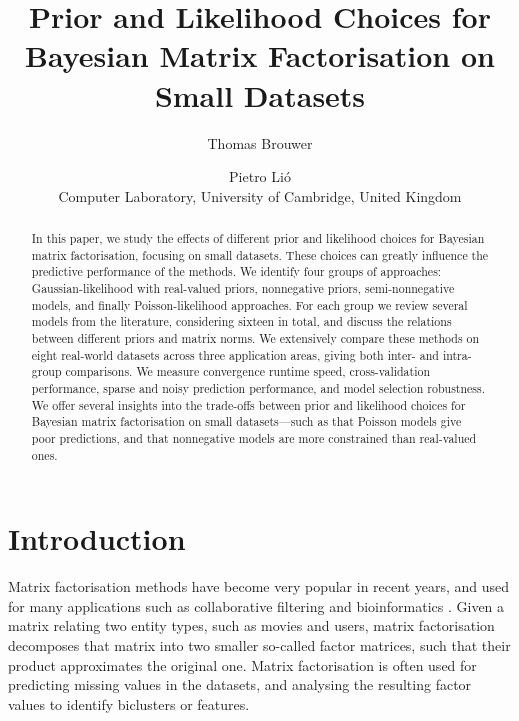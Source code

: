 \documentclass[letterpaper]{article} %
\begin{document}
%
\title{Prior and Likelihood Choices for Bayesian Matrix Factorisation on Small Datasets}
\author{Thomas Brouwer \and Pietro Li\'{o} \\
Computer Laboratory, University of Cambridge, United Kingdom \\
}
\maketitle
\begin{abstract}
	In this paper, we study the effects of different prior and likelihood choices for Bayesian matrix factorisation, focusing on small datasets. These choices can greatly influence the predictive performance of the methods. We identify four groups of approaches: Gaussian-likelihood with real-valued priors, nonnegative priors, semi-nonnegative models, and finally Poisson-likelihood approaches. For each group we review several models from the literature, considering sixteen in total, and discuss the relations between different priors and matrix norms. We extensively compare these methods on eight real-world datasets across three application areas, giving both inter- and intra-group comparisons. We measure convergence runtime speed, cross-validation performance, sparse and noisy prediction performance, and model selection robustness. We offer several insights into the trade-offs between prior and likelihood choices for Bayesian matrix factorisation on small datasets---such as that Poisson models give poor predictions, and that nonnegative models are more constrained than real-valued ones.
\end{abstract}


\section{Introduction}
	Matrix factorisation methods have become very popular in recent years, and used for many applications such as collaborative filtering \cite{Mnih2008,Chen2009} and bioinformatics \cite{Gonen2012,Brouwer2017a}. Given a matrix relating two entity types, such as movies and users, matrix factorisation decomposes that matrix into two smaller so-called factor matrices, such that their product approximates the original one. Matrix factorisation is often used for predicting missing values in the datasets, and analysing the resulting factor values to identify biclusters or features.
	
\end{document}
